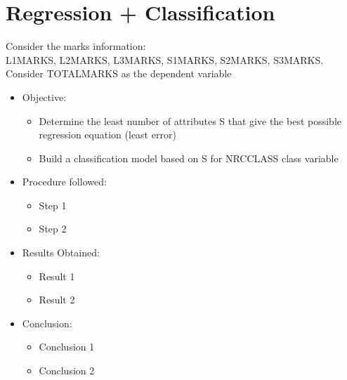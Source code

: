 \chapter{Regression + Classification}
Consider the marks information: \\
L1\textunderscore MARKS, L2\textunderscore MARKS, L3\textunderscore MARKS, S1\textunderscore MARKS, S2\textunderscore MARKS, S3\textunderscore MARKS. Consider TOTAL\textunderscore MARKS as the dependent variable
\begin{itemize}
	\item
	Objective:
	\begin{itemize}
		\item
		Determine the least number of attributes S that give the best possible regression equation (least error)
		\item
		Build a classification model based on S for NRC\textunderscore CLASS class variable
	\end{itemize}
	
	\item
	Procedure followed: 
	\begin{itemize}
		\item
		Step 1
		\item
		Step 2
	\end{itemize}
	
	\item
	Results Obtained:
	\begin{itemize}
		\item
		Result 1
		\item
		Result 2
	\end{itemize}
	
	\item
	Conclusion:
	\begin{itemize}
		\item
		Conclusion 1
		\item
		Conclusion 2
	\end{itemize}
\end{itemize}